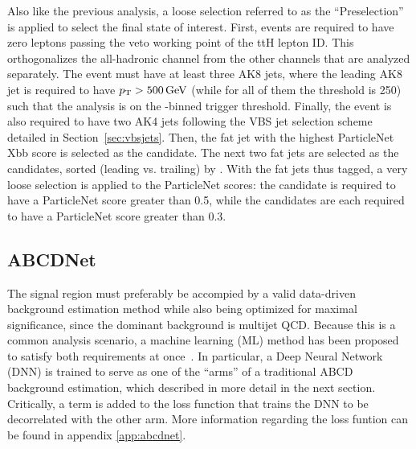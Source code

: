 Also like the previous analysis, a loose selection referred to as the ``Preselection'' is applied to select the final state of interest. 
First, events are required to have zero leptons passing the veto working point of the ttH lepton ID. 
This orthogonalizes the all-hadronic channel from the other channels that are analyzed separately. 
The event must have at least three AK8 jets, where the leading AK8 jet is required to have $p_{\mathrm{T}} > 500\,\text{Ge\hspace{-.08em}V}$ (while for all of them the \pt threshold is 250\GeV) such that the analysis is on the \HT-binned trigger threshold. 
Finally, the event is also required to have two AK4 jets following the VBS jet selection scheme detailed in Section~\ref{sec:vbsjets}.
Then, the fat jet with the highest ParticleNet Xbb score is selected as the \Htobb candidate. 
The next two fat jets are selected as the \Vtoqq candidates, sorted (leading vs. trailing) by \pt.
With the fat jets thus tagged, a very loose selection is applied to the ParticleNet scores: the \Htobb candidate is required to have a ParticleNet \Xtobb score greater than 0.5, while the \Vtoqq candidates are each required to have a ParticleNet \XWtoqq score greater than 0.3.

\subsection{ABCDNet}
The signal region must preferably be accompied by a valid data-driven background estimation method while also being optimized for maximal significance, since the dominant background is multijet QCD.
Because this is a common analysis scenario, a machine learning (ML) method has been proposed to satisfy both requirements at once~\cite{AutoABCD}. 
In particular, a Deep Neural Network (DNN) is trained to serve as one of the ``arms'' of a traditional ABCD background estimation, which described in more detail in the next section. 
Critically, a term \dCorrSq is added to the loss function that trains the DNN to be decorrelated with the other arm. More information regarding the loss funtion can be found in appendix \ref{app:abcdnet}.

